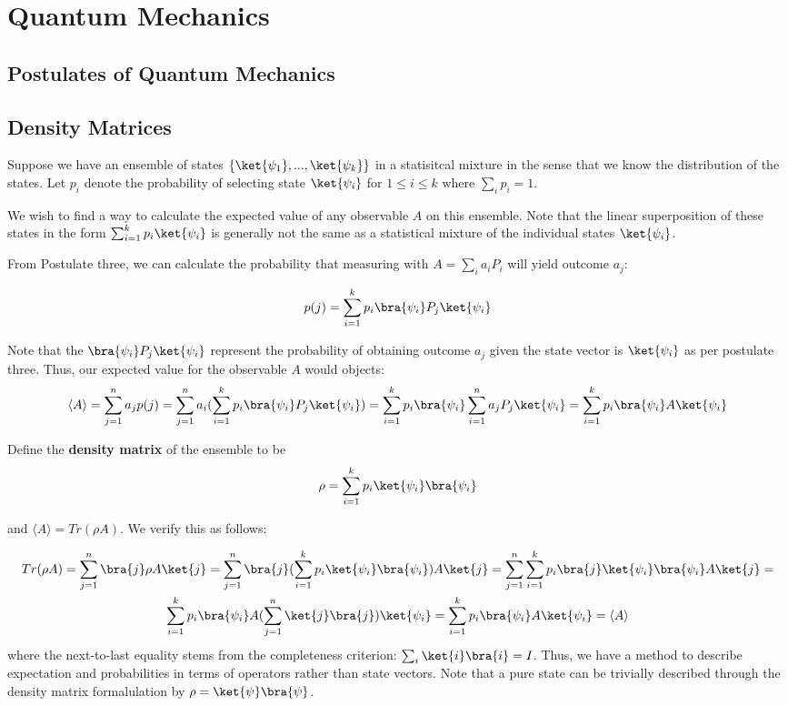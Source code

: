 \section{Quantum Mechanics}

\subsection{Postulates of Quantum Mechanics}

\subsection{Density Matrices}

Suppose we have an ensemble of states $\{\ket{\psi_1},...,\ket{\psi_k}\}$ in a statisitcal mixture in the sense that we know the distribution of the states. Let $p_i$ denote the probability of selecting state $\ket{\psi_i}$ for $1 \leq i \leq k$ where $\sum_i p_i = 1$.

We wish to find a way to calculate the expected value of any observable $A$ on this ensemble. Note that the linear superposition of these states in the form $\sum_{i=1}^k p_i \ket{\psi_i}$ is generally not the same as a statistical mixture of the individual states $\ket{\psi_i}$.

From Postulate three, we can calculate the probability that measuring with $A = \sum_i a_iP_i$ will yield outcome $a_j$:

$$ p(j) = \sum_{i=1}^k p_i \bra{\psi_i}P_j\ket{\psi_i} $$

Note that the $\bra{\psi_i}P_j\ket{\psi_i}$ represent the probability of obtaining outcome $a_j$ given the state vector is $\ket{\psi_i}$ as per postulate three. Thus, our expected value for the observable $A$ would objects:
$$ \langle A \rangle = \sum_{j=1}^n a_j p(j) = \sum_{j=1}^n a_i (\sum_{i=1}^k p_i \bra{\psi_i}P_j\ket{\psi_i}) = \sum_{i=1}^k p_i \bra{\psi_i}\sum_{i=1}^n a_j P_j\ket{\psi_i} = \sum_{i=1}^kp_i \bra{\psi_i}A\ket{\psi_i} $$

Define the {\bf density matrix} of the ensemble to be
$$ \rho = \sum_{i=1}^k p_i \ket{\psi_i}\bra{\psi_i} $$

and $\langle A \rangle = Tr(\rho A)$. We verify this as follows:

\begin{gather}
 Tr(\rho A) = \sum_{j=1}^n \bra{j}\rho A \ket{j} = \sum_{j=1}^n \bra{j} (\sum_{i=1}^k p_i\ket{\psi_i} \bra{\psi_i})A\ket{j} = \sum_{j=1}^n \sum_{i=1}^k p_i \bra{j}\ket{\psi_i}\bra{\psi_i}A\ket{j} = \\
 \sum_{i=1}^k p_i\bra{\psi_i}A(\sum_{j=1}^n \ket{j}\bra{j}) \ket{\psi_i} = \sum_{i=1}^k p_i \bra{\psi_i}A\ket{\psi_i} = \langle A \rangle
\end{gather}
where the next-to-last equality stems from the completeness criterion: $\sum_i \ket{i}\bra{i} = I$. Thus, we have a method to describe expectation and probabilities in terms of operators rather than state vectors. Note that a pure state can be trivially described through the density matrix formalulation by $\rho = \ket{\psi}\bra{\psi}$.

